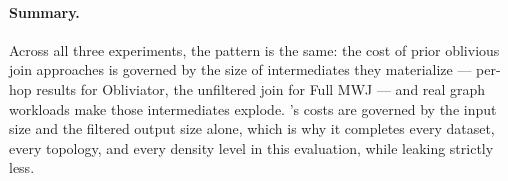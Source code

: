\paragraph{Summary.}
Across all three experiments, the pattern is the same: the cost of prior
oblivious join approaches is governed by the size of intermediates they
materialize --- per-hop results for Obliviator, the unfiltered join for
Full MWJ --- and real graph workloads make those intermediates explode.
\system's costs are governed by the input size and the filtered output
size alone, which is why it completes every dataset, every topology, and
every density level in this evaluation, while leaking strictly less.
